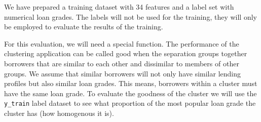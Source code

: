 \documentclass[11pt]{article}
\begin{document}
We have prepared a training dataset with 34 features and a label set
with numerical loan grades. The labels will not be used for the
training, they will only be employed to evaluate the results of the
training.

For this evaluation, we will need a special function. The performance of
the clustering application can be called good when the separation groups
together borrowers that are similar to each other and dissimilar to
members of other groups. We assume that similar borrowers will not only
have similar lending profiles but also similar loan grades. This means,
borrowers within a cluster must have the same loan grade. To evaluate
the goodness of the cluster we will use the \texttt{y\_train} label
dataset to see what proportion of the most popular loan grade the
cluster has (how homogenous it is).
\end{document}
